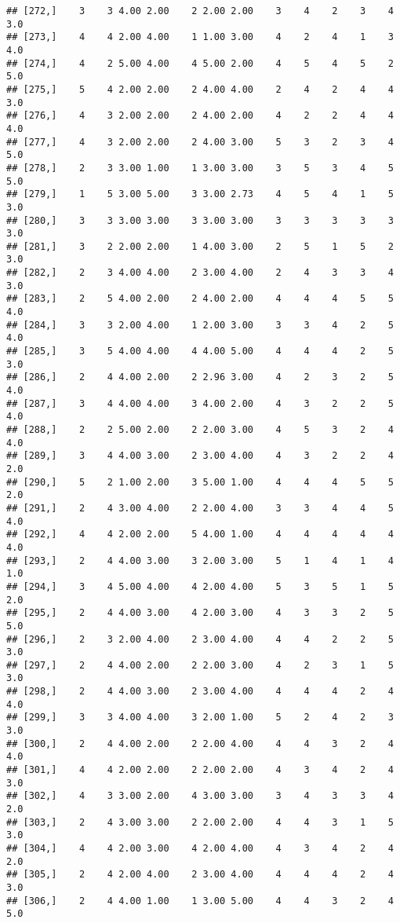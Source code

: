 \documentclass[]{article}
\begin{document}
\begin{verbatim}
## [272,]    3    3 4.00 2.00    2 2.00 2.00    3    4    2    3    4  3.0
## [273,]    4    4 2.00 4.00    1 1.00 3.00    4    2    4    1    3  4.0
## [274,]    4    2 5.00 4.00    4 5.00 2.00    4    5    4    5    2  5.0
## [275,]    5    4 2.00 2.00    2 4.00 4.00    2    4    2    4    4  3.0
## [276,]    4    3 2.00 2.00    2 4.00 2.00    4    2    2    4    4  4.0
## [277,]    4    3 2.00 2.00    2 4.00 3.00    5    3    2    3    4  5.0
## [278,]    2    3 3.00 1.00    1 3.00 3.00    3    5    3    4    5  5.0
## [279,]    1    5 3.00 5.00    3 3.00 2.73    4    5    4    1    5  3.0
## [280,]    3    3 3.00 3.00    3 3.00 3.00    3    3    3    3    3  3.0
## [281,]    3    2 2.00 2.00    1 4.00 3.00    2    5    1    5    2  3.0
## [282,]    2    3 4.00 4.00    2 3.00 4.00    2    4    3    3    4  3.0
## [283,]    2    5 4.00 2.00    2 4.00 2.00    4    4    4    5    5  4.0
## [284,]    3    3 2.00 4.00    1 2.00 3.00    3    3    4    2    5  4.0
## [285,]    3    5 4.00 4.00    4 4.00 5.00    4    4    4    2    5  3.0
## [286,]    2    4 4.00 2.00    2 2.96 3.00    4    2    3    2    5  4.0
## [287,]    3    4 4.00 4.00    3 4.00 2.00    4    3    2    2    5  4.0
## [288,]    2    2 5.00 2.00    2 2.00 3.00    4    5    3    2    4  4.0
## [289,]    3    4 4.00 3.00    2 3.00 4.00    4    3    2    2    4  2.0
## [290,]    5    2 1.00 2.00    3 5.00 1.00    4    4    4    5    5  2.0
## [291,]    2    4 3.00 4.00    2 2.00 4.00    3    3    4    4    5  4.0
## [292,]    4    4 2.00 2.00    5 4.00 1.00    4    4    4    4    4  4.0
## [293,]    2    4 4.00 3.00    3 2.00 3.00    5    1    4    1    4  1.0
## [294,]    3    4 5.00 4.00    4 2.00 4.00    5    3    5    1    5  2.0
## [295,]    2    4 4.00 3.00    4 2.00 3.00    4    3    3    2    5  5.0
## [296,]    2    3 2.00 4.00    2 3.00 4.00    4    4    2    2    5  3.0
## [297,]    2    4 4.00 2.00    2 2.00 3.00    4    2    3    1    5  3.0
## [298,]    2    4 4.00 3.00    2 3.00 4.00    4    4    4    2    4  4.0
## [299,]    3    3 4.00 4.00    3 2.00 1.00    5    2    4    2    3  3.0
## [300,]    2    4 4.00 2.00    2 2.00 4.00    4    4    3    2    4  4.0
## [301,]    4    4 2.00 2.00    2 2.00 2.00    4    3    4    2    4  3.0
## [302,]    4    3 3.00 2.00    4 3.00 3.00    3    4    3    3    4  2.0
## [303,]    2    4 3.00 3.00    2 2.00 2.00    4    4    3    1    5  3.0
## [304,]    4    4 2.00 3.00    4 2.00 4.00    4    3    4    2    4  2.0
## [305,]    2    4 2.00 4.00    2 3.00 4.00    4    4    4    2    4  3.0
## [306,]    2    4 4.00 1.00    1 3.00 5.00    4    4    3    2    4  5.0

\end{verbatim}
\end{document}
